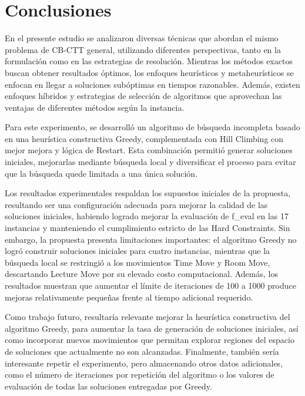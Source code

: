 \documentclass[letter, 10pt]{article}
\begin{document}
\section{Conclusiones}
En el presente estudio se analizaron diversas t\'ecnicas que abordan el mismo problema de CB-CTT general, utilizando diferentes perspectivas, tanto en la formulaci\'on como en las estrategias de resoluci\'on. Mientras los m\'etodos exactos buscan obtener resultados \'optimos, los enfoques heur\'isticos y metaheur\'isticos se enfocan en llegar a soluciones sub\'optimas en tiempos razonables. Adem\'as, existen enfoques h\'ibridos y estrategias de selecci\'on de algoritmos que aprovechan las ventajas de diferentes m\'etodos seg\'un la instancia.

Para este experimento, se desarroll\'o un algoritmo de b\'usqueda incompleta basado en una heur\'istica constructiva Greedy, complementada con Hill Climbing con mejor mejora y l\'ogica de Restart. Esta combinaci\'on permiti\'o generar soluciones iniciales, mejorarlas mediante b\'usqueda local y diversificar el proceso para evitar que la b\'usqueda quede limitada a una \'unica soluci\'on.

Los resultados experimentales respaldan los supuestos iniciales de la propuesta, resultando ser una configuraci\'on adecuada para mejorar la calidad de las soluciones iniciales, habiendo logrado mejorar la evaluaci\'on de f\_eval en las 17 instancias y manteniendo el cumplimiento estricto de las Hard Constraints. Sin embargo, la propuesta presenta limitaciones importantes: el algoritmo Greedy no logr\'o construir soluciones iniciales para cuatro instancias, mientras que la b\'usqueda local se restringi\'o a los movimientos Time Move y Room Move, descartando Lecture Move por su elevado costo computacional. Adem\'as, los resultados muestran que aumentar el l\'imite de iteraciones de 100 a 1000 produce mejoras relativamente peque\~nas frente al tiempo adicional requerido.

Como trabajo futuro, resultar\'ia relevante mejorar la heur\'istica constructiva del algoritmo Greedy, para aumentar la tasa de generaci\'on de soluciones iniciales, as\'i como incorporar nuevos movimientos que permitan explorar regiones del espacio de soluciones que actualmente no son alcanzadas. Finalmente, tambi\'en ser\'ia interesante repetir el experimento, pero almacenando otros datos adicionales, como el n\'umero de iteraciones por repetici\'on del algoritmo o los valores de evaluaci\'on de todas las soluciones entregadas por Greedy.
\end{document}
